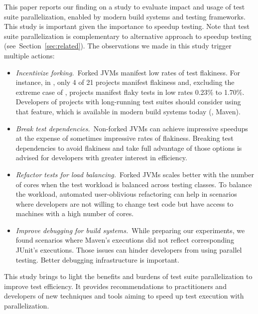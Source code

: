 \documentclass[10pt,journal,compsoc]{IEEEtran}
\begin{document}
This paper reports our finding on a study to evaluate impact and usage
of test suite parallelization, enabled by modern build systems and
testing frameworks.  This study is important given the importance to
speedup testing.  Note that test suite parallelization is
complementary to alternative approach to speedup testing
(see~Section~\ref{sec:related}).  The observations we made in this
study trigger multiple actions:

\begin{itemize}
\item \emph{Incentivize forking.}~Forked JVMs manifest low rates of
  test flakiness.  For instance, in \emph{\ForkSeq{}}, only 4 of 21
  projects manifest flakiness and, excluding the extreme case of
  , projects manifest flaky tests in low rates 0.23\%
  to 1.70\%.  Developers of projects with long-running test suites
  should consider using that feature, which is available in modern
  build systems today (\eg{}, Maven).
\item \emph{Break test dependencies.}~Non-forked JVMs can achieve
  impressive speedups at the expense of sometimes impressive rates of
  flakiness.  Breaking test dependencies to avoid flakiness and take
  full advantage of those options is advised for developers with
  greater interest in efficiency.
\item \emph{Refactor tests for load balancing.}~Forked JVMs scales
  better with the number of cores when the test workload is balanced
  across testing classes.  To balance the workload, automated
  user-oblivious refactoring can help in scenarios where developers
  are not willing to change test code but have access to machines with
  a high number of cores.
\item \emph{Improve debugging for build systems.}~While preparing our
  experiments, we found scenarios where Maven's executions did not reflect
  corresponding JUnit's executions.  Those issues can hinder developers from using parallel
  testing. Better debugging infrastructure is important.
\end{itemize}

This study brings to light the benefits and burdens of test suite
parallelization to improve test efficiency. It provides
recommendations to practitioners and developers of new techniques and
tools aiming to speed up test execution with parallelization.

\end{document}
